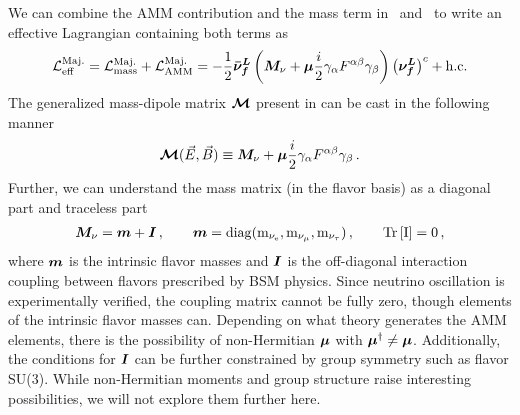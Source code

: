 We can combine the AMM contribution and the mass term in~ and~ to write an effective Lagrangian containing both terms as
\begin{align}
	\label{massmom:1}
    \mathcal{L}_{\rm eff}^{\rm Maj.}=\mathcal{L}_{\rm mass}^{\rm Maj.} + \mathcal{L}_{\rm AMM}^{\rm Maj.}=-\frac{1}{2}\boldsymbol{\bar{\nu}_{f}^{L}}\left(\boldsymbol{M}_{\nu}+\boldsymbol{\mu}\frac{i}{2}\gamma_{\alpha}F^{\alpha\beta}\gamma_{\beta}\right)\left(\boldsymbol{\nu_{f}^{L}}\right)^{c}+\rm{h.c.}
\end{align}
The generalized mass-dipole matrix $\boldsymbol{\mathcal M}$ present in  can be cast in the following manner
\begin{align}
	\label{massmom:2}
    {\boldsymbol{\mathcal{M}}}(\vec{E},\vec{B})\equiv\boldsymbol{M}_{\nu}+\boldsymbol{\mu}\frac{i}{2}\gamma_{\alpha}F^{\alpha\beta}\gamma_{\beta}\,.
\end{align}
Further, we can understand the mass matrix (in the flavor basis) as a diagonal part and traceless part
\begin{align}
	\label{massmom:3}
    \boldsymbol{M}_{\nu}=\boldsymbol{m}+\boldsymbol{I}\,,\qquad
    \boldsymbol{m}=\rm{diag}(m_{\nu_{e}},m_{\nu_{\mu}},m_{\nu_{\tau}})\,,\qquad
    \rm{Tr}\left[\boldsymbol{I}\right] = 0 \,,
\end{align}
where $\boldsymbol{m}$ is the intrinsic flavor masses and $\boldsymbol{I}$ is the off-diagonal interaction coupling between flavors prescribed by BSM physics. Since neutrino oscillation is experimentally verified, the coupling matrix cannot be fully zero, though elements of the intrinsic flavor masses can. Depending on what theory generates the AMM elements, there is the possibility of non-Hermitian $\boldsymbol{\mu}$ with $\boldsymbol{\mu}^{\dagger}\neq\boldsymbol{\mu}$. Additionally, the conditions for $\boldsymbol{I}$ can be further constrained by group symmetry such as flavor SU(3). While non-Hermitian moments and group structure raise interesting possibilities, we will not explore them further here. 

